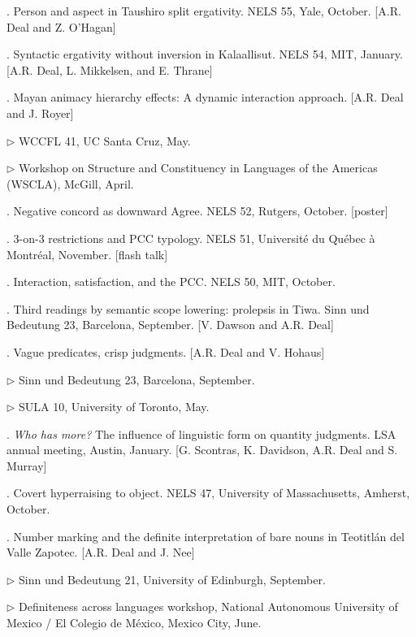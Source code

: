\documentclass[12pt]{article}
\begin{document}
. Person and aspect in Taushiro split ergativity. NELS 55, Yale, October. [A.R. Deal and Z. O'Hagan]

. Syntactic ergativity without inversion in Kalaallisut. NELS 54, MIT, January. [A.R. Deal, L. Mikkelsen, and E. Thrane]

. Mayan animacy hierarchy effects: A dynamic interaction approach. [A.R. Deal and J. Royer]

\indd $\rhd$ WCCFL 41, UC Santa Cruz, May. 

\indd $\rhd$ Workshop on Structure and Constituency in Languages of the Americas (WSCLA), McGill, April. 



. Negative concord as downward Agree. NELS 52, Rutgers, October. [poster]

. 3-on-3 restrictions and PCC typology. NELS 51, Universit\'e du Qu\'ebec \`a Montr\'eal, November. [flash talk]

. Interaction, satisfaction, and the PCC. NELS 50, MIT, October. 

. Third readings by semantic scope lowering: prolepsis in Tiwa.  Sinn und Bedeutung 23, Barcelona, September. [V. Dawson and A.R. Deal]

. Vague predicates, crisp judgments. [A.R. Deal and V. Hohaus]

\indd $\rhd$ Sinn und Bedeutung 23, Barcelona, September. 

\indd $\rhd$ SULA 10, University of Toronto, May. 

. \emph{Who has more?} The influence of linguistic form on quantity judgments. LSA annual meeting, Austin, January. [G. Scontras, K. Davidson, A.R. Deal and S. Murray]

. Covert hyperraising to object. NELS 47, University of Massachusetts, Amherst, October. %

  . Number marking and the definite interpretation of bare nouns in Teotitl\'an del Valle Zapotec.  [A.R. Deal and J. Nee]

\indd $\rhd$    Sinn und Bedeutung 21, University of Edinburgh, September. 

 
\indd $\rhd$  Definiteness across languages workshop, National Autonomous University of Mexico / El Colegio de M\'exico, Mexico City, June. 
\end{document}
